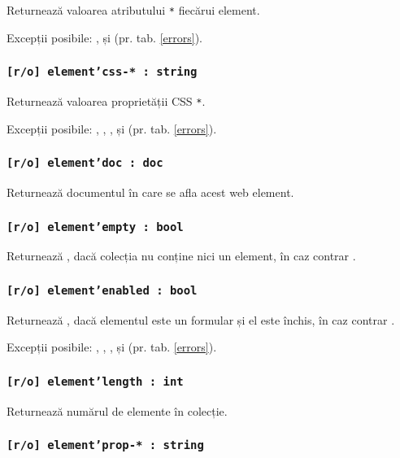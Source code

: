 Returnează valoarea atributului \texttt{*} fiecărui element. 

Excepții posibile: ,  și  (pr. tab. \ref{errors}).

\subsubsection{\texttt{[r/o] element'css-* : string}}

Returnează valoarea proprietății CSS \texttt{*}.

Excepții posibile: , , ,  și  (pr. tab. \ref{errors}).

\subsubsection{\texttt{[r/o] element'doc : doc}}

Returnează documentul în care se afla acest web element.

\subsubsection{\texttt{[r/o] element'empty : bool}}

Returnează \true, dacă colecția nu conține nici un element, în caz contrar \false.

\subsubsection{\texttt{[r/o] element'enabled : bool}}

Returnează \false, dacă elementul este un formular și el este închis, în caz contrar \true.

Excepții posibile: , , ,  și  (pr. tab. \ref{errors}).

\subsubsection{\texttt{[r/o] element'length : int}}

Returnează numărul de elemente în colecție.

\subsubsection{\texttt{[r/o] element'prop-* : string}}

